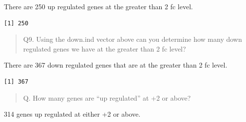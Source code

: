 \documentclass[
  letterpaper,
  DIV=11,
  numbers=noendperiod]{scrartcl}
\newenvironment{Shaded}{\begin{snugshade}}{\end{snugshade}}
\newcommand{\DecValTok}[1]{\textcolor[rgb]{0.68,0.00,0.00}{#1}}
\newcommand{\FunctionTok}[1]{\textcolor[rgb]{0.28,0.35,0.67}{#1}}
\newcommand{\NormalTok}[1]{\textcolor[rgb]{0.00,0.23,0.31}{#1}}
\newcommand{\OtherTok}[1]{\textcolor[rgb]{0.00,0.23,0.31}{#1}}
\newcommand{\SpecialCharTok}[1]{\textcolor[rgb]{0.37,0.37,0.37}{#1}}
\begin{document}
There are 250 up regulated genes at the greater than 2 fc level.

\begin{Shaded}
\end{Shaded}

\begin{verbatim}
[1] 250
\end{verbatim}

\begin{quote}
Q9. Using the down.ind vector above can you determine how many down
regulated genes we have at the greater than 2 fc level?
\end{quote}

There are 367 down regulated genes that are at the greater than 2 fc
level.

\begin{Shaded}
\end{Shaded}

\begin{verbatim}
[1] 367
\end{verbatim}

\begin{quote}
Q. How many genes are ``up regulated'' at +2 or above?
\end{quote}

314 genes up regulated at either +2 or above.

\begin{Shaded}
\end{Shaded}
\end{document}
